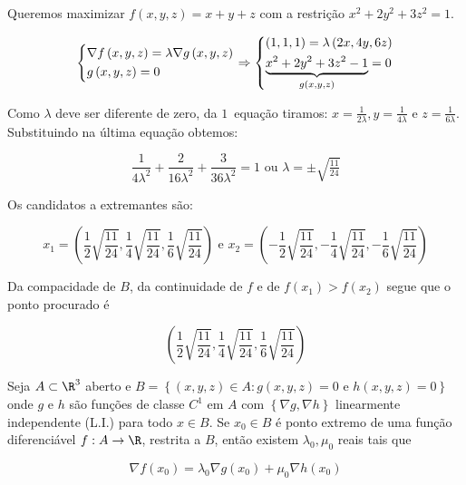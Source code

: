 \documentclass[11pt, oneside, a4paper]{gsm-l}
\begin{document}
\begin{sol}
    Queremos maximizar $f\left( {x,y,z} \right) = x + y + z$ com a restrição $x^2  + 2y^2  + 3z^2  = 1$.

\[
\left\{ \begin{gathered}
  \nabla f\left( {x,y,z} \right) = \lambda \nabla g\left( {x,y,z} \right) \hfill \\
g\left( {x,y,z} \right) = 0 \hfill \\
\end{gathered}  \right. \Rightarrow \left\{ \begin{gathered}
\left( {1,1,1} \right) = \lambda \left( {2x,4y,6z} \right) \hfill \\
\underbrace {x^2  + 2y^2  + 3z^2  - 1}_{g\left( {x,y,z} \right)} = 0 \hfill \\
\end{gathered}  \right.
\]

    Como $\lambda$ deve ser diferente de zero, da $1$\textordfeminine\ equação tiramos: $x = \frac{1}{{2\lambda }},y = \frac{1}{{4\lambda }}$ e $z = \frac{1}{{6\lambda }}$. Substituindo na \'ultima equação obtemos:

\[
    \frac{1}{{4\lambda ^2 }} + \frac{2}{{16\lambda ^2 }} + \frac{3}{{36\lambda ^2 }} = 1{\text{ ou }}\lambda  =  \pm \sqrt {\tfrac{{11}}{{24}}}
\]

Os candidatos a extremantes são:

\[
x_1  = \left( {\frac{1}
{2}\sqrt {\frac{{11}}
{{24}}} ,\frac{1}
{4}\sqrt {\frac{{11}}
{{24}}} ,\frac{1}
{6}\sqrt {\frac{{11}}
{{24}}} } \right){\text{ e }}x_2  = \left( { - \frac{1}
{2}\sqrt {\frac{{11}}
{{24}}} , - \frac{1}
{4}\sqrt {\frac{{11}}
{{24}}} , - \frac{1}
{6}\sqrt {\frac{{11}}
{{24}}} } \right)
\]

    Da compacidade de $B$, da continuidade de $f$ e de $f\left( {x_1 } \right) > f\left( {x_2 } \right)$ segue que o ponto procurado é

\[
\left( {\frac{1}
{2}\sqrt {\frac{{11}}
{{24}}} ,\frac{1}
{4}\sqrt {\frac{{11}}
{{24}}} ,\frac{1}
{6}\sqrt {\frac{{11}}
{{24}}} } \right)
\]

\end{sol}

\begin{teo}
    Seja $A \subset \R^3$ aberto e $B = \left\{ {\left( {x,y,z} \right) \in A:g\left( {x,y,z} \right) = 0{\text{ e }}h\left( {x,y,z} \right) = 0} \right\}$ onde $g$ e $h$ são funções de classe $C^1$ em $A$ com $\left\{ {\nabla g,\nabla h} \right\}$ linearmente independente (L.I.) para todo $x \in B$. Se $x_0 \in B$ é ponto extremo de uma função diferenciável $f:A \to \R$, restrita a $B$, então existem $\lambda _0 ,\mu _0$ reais tais que

\[
    \nabla f\left( {x_0 } \right) = \lambda _0 \nabla g\left( {x_0 } \right) + \mu _0 \nabla h\left( {x_0 } \right)
\]

\end{teo}
\end{document}
